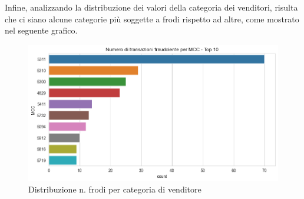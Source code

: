 \documentclass[]{article}
\begin{document}
        Infine, analizzando la distribuzione dei valori della categoria dei venditori, risulta che ci siano alcune categorie più soggette a frodi rispetto ad altre, come mostrato nel seguente grafico.
       \begin{figure}[H]
            \centering
            \includegraphics[width=.4\textwidth]{img/DistribuzioneMCC.png}
            \caption[short]{Distribuzione n. frodi per categoria di venditore}
        \end{figure}
\end{document}
